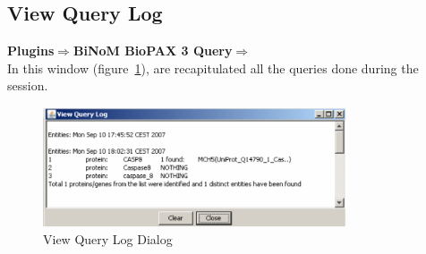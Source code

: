 \subsection{View Query Log}
\textbf{Plugins$\Rightarrow$BiNoM BioPAX 3 Query$\Rightarrow$}\\
In this window (figure~\ref{BioPAXViewQueryLogDialog}), are recapitulated all the queries done during the session.
\begin{figure}[h]
\centering
\includegraphics[width=0.8\textwidth]{graphics/BioPAXViewQueryLogDialog}
\caption{View Query Log Dialog}
\label{BioPAXViewQueryLogDialog}
\end{figure}